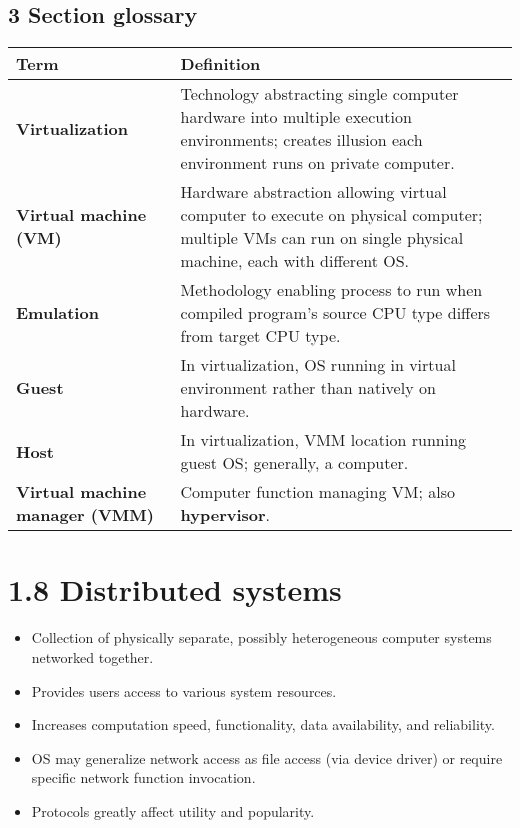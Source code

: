 \documentclass{article}
\begin{document}
\subsection*{3 Section glossary}
\centering
\begin{tabular}{>{\raggedright}p{} >{\raggedright\arraybackslash}p{}}
\toprule
\textbf{Term} & \textbf{Definition} \\
\midrule
\textbf{Virtualization} & Technology abstracting single computer hardware into multiple execution environments; creates illusion each environment runs on private computer. \\
\textbf{Virtual machine (VM)} & Hardware abstraction allowing virtual computer to execute on physical computer; multiple VMs can run on single physical machine, each with different OS. \\
\textbf{Emulation} & Methodology enabling process to run when compiled program's source CPU type differs from target CPU type. \\
\textbf{Guest} & In virtualization, OS running in virtual environment rather than natively on hardware. \\
\textbf{Host} & In virtualization, VMM location running guest OS; generally, a computer. \\
\textbf{Virtual machine manager (VMM)} & Computer function managing VM; also \textbf{hypervisor}. \\
\bottomrule
\end{tabular}
\vspace{\baselineskip}
\newpage
\section*{1.8 Distributed systems}
\begin{itemize}
    \item Collection of physically separate, possibly heterogeneous computer systems networked together.
    \item Provides users access to various system resources.
    \item Increases computation speed, functionality, data availability, and reliability.
    \item OS may generalize network access as file access (via device driver) or require specific network function invocation.
    \item Protocols greatly affect utility and popularity.
\end{itemize}
\end{document}
